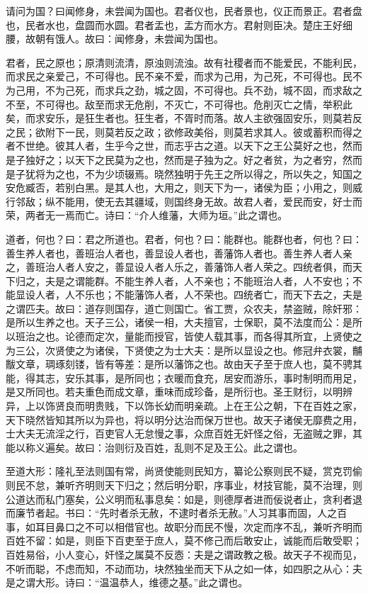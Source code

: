 \documentclass[]{article}
\begin{document}
请问为国？曰闻修身，未尝闻为国也。君者仪也，民者景也，仪正而景正。君者盘也，民者水也，盘圆而水圆。君者盂也，盂方而水方。君射则臣决。楚庄王好细腰，故朝有饿人。故曰：闻修身，未尝闻为国也。

君者，民之原也；原清则流清，原浊则流浊。故有社稷者而不能爱民，不能利民，而求民之亲爱己，不可得也。民不亲不爱，而求为己用，为己死，不可得也。民不为己用，不为己死，而求兵之劲，城之固，不可得也。兵不劲，城不固，而求敌之不至，不可得也。敌至而求无危削，不灭亡，不可得也。危削灭亡之情，举积此矣，而求安乐，是狂生者也。狂生者，不胥时而落。故人主欲强固安乐，则莫若反之民；欲附下一民，则莫若反之政；欲修政美俗，则莫若求其人。彼或蓄积而得之者不世绝。彼其人者，生乎今之世，而志乎古之道。以天下之王公莫好之也，然而是子独好之；以天下之民莫为之也，然而是子独为之。好之者贫，为之者穷，然而是子犹将为之也，不为少顷辍焉。晓然独明于先王之所以得之，所以失之，知国之安危臧否，若别白黑。是其人也，大用之，则天下为一，诸侯为臣；小用之，则威行邻敌；纵不能用，使无去其疆域，则国终身无故。故君人者，爱民而安，好士而荣，两者无一焉而亡。诗曰：``介人维藩，大师为垣。''此之谓也。

道者，何也？曰：君之所道也。君者，何也？曰：能群也。能群也者，何也？曰：善生养人者也，善班治人者也，善显设人者也，善藩饰人者也。善生养人者人亲之，善班治人者人安之，善显设人者人乐之，善藩饰人者人荣之。四统者俱，而天下归之，夫是之谓能群。不能生养人者，人不亲也；不能班治人者，人不安也；不能显设人者，人不乐也；不能藩饰人者，人不荣也。四统者亡，而天下去之，夫是之谓匹夫。故曰：道存则国存，道亡则国亡。省工贾，众农夫，禁盗贼，除奸邪：是所以生养之也。天子三公，诸侯一相，大夫擅官，士保职，莫不法度而公：是所以班治之也。论德而定次，量能而授官，皆使人载其事，而各得其所宜，上贤使之为三公，次贤使之为诸侯，下贤使之为士大夫：是所以显设之也。修冠弁衣裳，黼黻文章，琱琢刻镂，皆有等差：是所以藩饰之也。故由天子至于庶人也，莫不骋其能，得其志，安乐其事，是所同也；衣暖而食充，居安而游乐，事时制明而用足，是又所同也。若夫重色而成文章，重味而成珍备，是所衍也。圣王财衍，以明辨异，上以饰贤良而明贵贱，下以饰长幼而明亲疏。上在王公之朝，下在百姓之家，天下晓然皆知其所以为异也，将以明分达治而保万世也。故天子诸侯无靡费之用，士大夫无流淫之行，百吏官人无怠慢之事，众庶百姓无奸怪之俗，无盗贼之罪，其能以称义遍矣。故曰：治则衍及百姓，乱则不足及王公。此之谓也。

至道大形：隆礼至法则国有常，尚贤使能则民知方，纂论公察则民不疑，赏克罚偷则民不怠，兼听齐明则天下归之；然后明分职，序事业，材技官能，莫不治理，则公道达而私门塞矣，公义明而私事息矣：如是，则德厚者进而佞说者止，贪利者退而廉节者起。书曰：``先时者杀无赦，不逮时者杀无赦。''人习其事而固，人之百事，如耳目鼻口之不可以相借官也。故职分而民不慢，次定而序不乱，兼听齐明而百姓不留：如是，则臣下百吏至于庶人，莫不修己而后敢安止，诚能而后敢受职；百姓易俗，小人变心，奸怪之属莫不反悫：夫是之谓政教之极。故天子不视而见，不听而聪，不虑而知，不动而功，块然独坐而天下从之如一体，如四胑之从心：夫是之谓大形。诗曰：``温温恭人，维德之基。''此之谓也。
\end{document}
